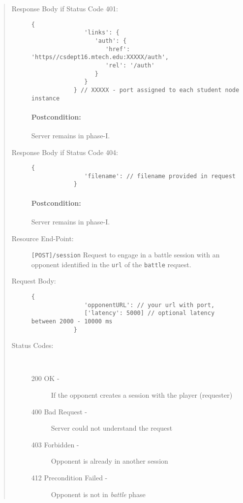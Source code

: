 \documentclass[10pt]{article}
\begin{document}
\begin{quote}
\begin{description}
      \item[Response Body if Status Code 401:]
         \begin{lstlisting}[gobble=12]
            {
               'links': {
                  'auth': {
                     'href': 'https//csdept16.mtech.edu:XXXXX/auth',
                     'rel': '/auth'
                  }
               }
            } // XXXXX - port assigned to each student node instance
         \end{lstlisting}

         \paragraph{Postcondition:} Server remains in phase-I.

      \item[Response Body if Status Code 404:]
         \begin{lstlisting}[gobble=12]
            {
               'filename': // filename provided in request
            }
         \end{lstlisting}

         \paragraph{Postcondition:} Server remains in phase-I.

      \newpage 
      \item[Resource End-Point:] \lstinline|[POST]/session| Request to engage in a battle session with an opponent identified in the \verb|url| of the \verb|battle| request. 
      
      \item[Request Body:]
         \begin{lstlisting}[gobble=12]
            {
               'opponentURL': // your url with port,
               ['latency': 5000] // optional latency between 2000 - 10000 ms
            }
         \end{lstlisting}
      
      \item[Status Codes:] ~
         \begin{description}
            \item[200 OK -] If the opponent creates a session with the player (requester)
            \item[400 Bad Request -] Server could not understand the request
            \item[403 Forbidden -] Opponent is already in another session
            \item[412 Precondition Failed -] Opponent is not in \emph{battle} phase   
         \end{description}


\end{description}
\end{quote}
\end{document}
